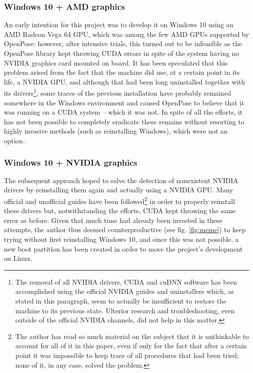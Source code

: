 \documentclass[12pt]{article}
\begin{document}
\subsubsection*{Windows 10 + AMD graphics}
\label{chap:win10amd}
An early intention for this project was to develop it on Windows 10 using an AMD Radeon Vega 64 GPU, which was among the few AMD GPUs supported by OpenPose\cite{opprereqwin}; however, after intensive trials, this turned out to be infeasible as the OpenPose library kept throwing CUDA errors in spite of the system having no NVIDIA graphics card mounted on board. It has been speculated that this problem arised from the fact that the machine did use, at a certain point in its life, a NVIDIA GPU, and although that had been long uninstalled together with its drivers\footnote{The removal of all NVIDIA drivers, CUDA and cuDNN software has been accomplished using the official NVIDIA guides and uninstallers which, as stated in this paragraph, seem to actually be insufficient to restore the machine to its previous state. Ulterior research and troubleshooting, even outside of the official NVIDIA channels, did not help in this matter.}, some traces of the previous installation have probably remained somewhere in the Windows environment and caused OpenPose to believe that it was running on a CUDA system – which it was not.
In spite of all the efforts, it has not been possible to completely eradicate these remains without resorting to highly invasive methods (such as reinstalling Windows), which were not an option.

\subsubsection*{Windows 10 + NVIDIA graphics}
\label{chap:win10nvidia}
The subsequent approach hoped to solve the detection of nonexistent NVIDIA drivers by reinstalling them again and actually using a NVIDIA GPU. Many official\cite{cudaofficialwin} and unofficial\cite{cudaunofficial} guides have been followed\footnote{The author has read so much material on the subject that it is unthinkable to account for all of it in this paper, even if only for the fact that after a certain point it was impossible to keep trace of all procedures that had been tried; none of it, in any case, solved the problem.} in order to properly reinstall these drivers but, notwithstanding the efforts, CUDA kept throwing the same error as before. Given that much time had already been invested in these attempts, the author thus deemed counterproductive (see fig. \ref{fig:meme}) to keep trying without first reinstalling Windows 10, and since this was not possible, a new boot partition has been created in order to move the project’s development on Linux.
\end{document}

